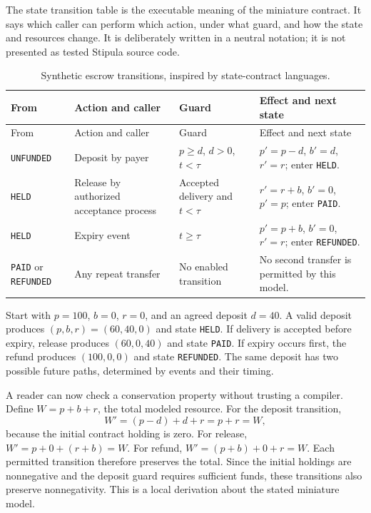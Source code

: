 The state transition table is the executable meaning of the miniature contract.
It says which caller can perform which action, under what guard, and how the
state and resources change. It is deliberately written in a neutral notation;
it is not presented as tested Stipula source code.

\begin{longtable}{@{}P{24mm}P{33mm}P{42mm}P{48mm}@{}}
\caption{Synthetic escrow transitions, inspired by state-contract languages.}\\
\toprule
From & Action and caller & Guard & Effect and next state\\\midrule\endfirsthead
\toprule From & Action and caller & Guard & Effect and next state\\\midrule\endhead
\texttt{UNFUNDED} & Deposit by payer & $p\geq d$, $d>0$, $t<\tau$ & $p'=p-d$, $b'=d$, $r'=r$; enter \texttt{HELD}.\\
\texttt{HELD} & Release by authorized acceptance process & Accepted delivery and $t<\tau$ & $r'=r+b$, $b'=0$, $p'=p$; enter \texttt{PAID}.\\
\texttt{HELD} & Expiry event & $t\geq\tau$ & $p'=p+b$, $b'=0$, $r'=r$; enter \texttt{REFUNDED}.\\
\texttt{PAID} or \texttt{REFUNDED} & Any repeat transfer & No enabled transition & No second transfer is permitted by this model.\\
\bottomrule
\end{longtable}

Start with $p=100$, $b=0$, $r=0$, and an agreed deposit $d=40$. A valid deposit
produces $(p,b,r)=(60,40,0)$ and state \texttt{HELD}. If delivery is accepted before
expiry, release produces $(60,0,40)$ and state \texttt{PAID}. If expiry occurs
first, the refund produces $(100,0,0)$ and state \texttt{REFUNDED}. The same deposit
has two possible future paths, determined by events and their timing.

A reader can now check a conservation property without trusting a compiler. Define
$W=p+b+r$, the total modeled resource. For the deposit transition,
\begin{equation}
 W'=(p-d)+d+r=p+r=W,
 \label{eq:escrow-deposit}
\end{equation}
because the initial contract holding is zero. For release,
$W'=p+0+(r+b)=W$. For refund, $W'=(p+b)+0+r=W$. Each permitted transition therefore
preserves the total. Since the initial holdings are nonnegative and the deposit
guard requires sufficient funds, these transitions also preserve nonnegativity.
This is a local derivation about the stated miniature model.

